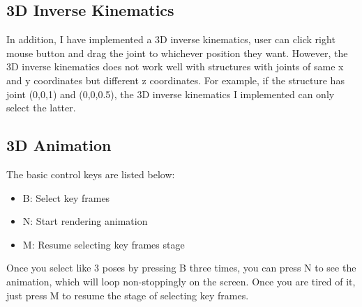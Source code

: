 \documentclass[a4paper, 11pt]{article}
\begin{document}
    \subsection{3D Inverse Kinematics}
        In addition, I have implemented a 3D inverse kinematics, user can click right mouse button and drag the joint to whichever position they want. However, the 3D inverse kinematics does not work well with structures with joints of same x and y coordinates but different z coordinates. For example, if the structure has joint (0,0,1) and (0,0,0.5), the 3D inverse kinematics I implemented can only select the latter.
    \subsection{3D Animation}
        The basic control keys are listed below:
        \begin{itemize}
          \item B: Select key frames
          \item N: Start rendering animation
          \item M: Resume selecting key frames stage
        \end{itemize}
        Once you select like 3 poses by pressing B three times, you can press N to see the animation, which will loop non-stoppingly on the screen. Once you are tired of it, just press M to resume the stage of selecting key frames.
\end{document}
